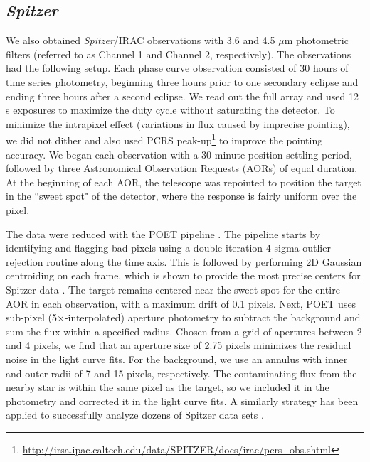 \documentclass[twocolumn, trackchanges]{aastex61}
\newcommand{\project}[1]{\textsl{#1}}
\newcommand{\Spitzer}{\project{Spitzer}}
\begin{document}
\subsection{\Spitzer}
We also obtained \Spitzer/IRAC observations with 3.6 and 4.5 $\mu$m photometric filters (referred to as Channel 1 and Channel 2, respectively). The observations had the following setup. Each phase curve observation consisted of 30 hours of time series photometry, beginning three hours prior to one secondary eclipse and ending three hours after a second eclipse.  We read out the full array and used 12 s exposures to maximize the duty cycle without saturating the detector. To minimize the intrapixel effect (variations in flux caused by imprecise pointing), we did not dither and also used PCRS peak-up\footnote{\url{http://irsa.ipac.caltech.edu/data/SPITZER/docs/irac/pcrs\_obs.shtml}} to improve the pointing accuracy. We began each observation with a 30-minute position settling period, followed by three Astronomical Observation Requests (AORs) of equal duration. At the beginning of each AOR, the telescope was repointed to position the target in the ``sweet spot" of the detector, where the response is fairly uniform over the pixel.

The data were reduced with the POET pipeline \citep{stevenson12, cubillos13}.  The pipeline starts by identifying and flagging bad pixels using a double-iteration 4-sigma outlier rejection routine along the time axis.  This is followed by performing 2D Gaussian centroiding on each frame, which is shown to provide the most precise centers for Spitzer data \citep{Lust2014}.  The target remains centered near the sweet spot for the entire AOR in each observation, with a maximum drift of 0.1 pixels.  Next, POET uses sub-pixel (5$\times$-interpolated) aperture photometry \citep{Harrington2007} to subtract the background and sum the flux within a specified radius.  Chosen from a grid of apertures between 2 and 4 pixels, we find that an aperture size of 2.75 pixels minimizes the residual noise in the light curve fits.  For the background, we use an annulus with inner and outer radii of 7 and 15 pixels, respectively.  The contaminating flux from the nearby star is within the same pixel as the target, so we included it in the photometry and corrected it in the light curve fits.  A similarly strategy has been applied to successfully analyze dozens of Spitzer data sets \citep[e.g. ][]{Stevenson2010, Stevenson2012a, Stevenson2012b, Stevenson2014a, Stevenson2014b, Stevenson2016a, Stevenson2017a, Campo2011, Nymeyer2011, cubillos13, Blecic2013, Blecic2014, HDL2014}.
\end{document}
